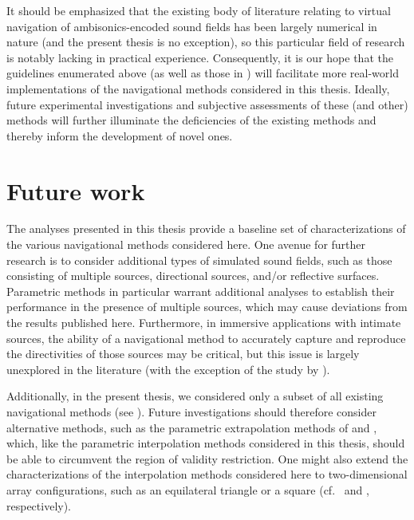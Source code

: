 It should be emphasized that the existing body of literature relating to virtual navigation of ambisonics-encoded sound fields has been largely numerical in nature (and the present thesis is no exception), so this particular field of research is notably lacking in practical experience.
Consequently, it is our hope that the guidelines enumerated above (as well as those in ) will facilitate more real-world implementations of the navigational methods considered in this thesis.
Ideally, future experimental investigations and subjective assessments of these (and other) methods will further illuminate the deficiencies of the existing methods and thereby inform the development of novel ones.

\section{Future work}
The analyses presented in this thesis provide a baseline set of characterizations of the various navigational methods considered here.
One avenue for further research is to consider additional types of simulated sound fields, such as those consisting of multiple sources, directional sources, and/or reflective surfaces.
Parametric methods in particular warrant additional analyses to establish their performance in the presence of multiple sources, which may cause deviations from the results published here.
Furthermore, in immersive applications with intimate sources, the ability of a navigational method to accurately capture and reproduce the directivities of those sources may be critical, but this issue is largely unexplored in the literature (with the exception of the study by \citet{Wakayama2017}).

Additionally, in the present thesis, we considered only a subset of all existing navigational methods (see ).
Future investigations should therefore consider alternative methods, such as the parametric extrapolation methods of \citet{Wakayama2017} and \citet{Plinge2018}, which, like the parametric interpolation methods considered in this thesis, should be able to circumvent the region of validity restriction.
One might also extend the characterizations of the interpolation methods considered here to two-dimensional array configurations, such as an equilateral triangle or a square (cf.~\citet{Mariette2010} and \citet{Bates2018}, respectively).

